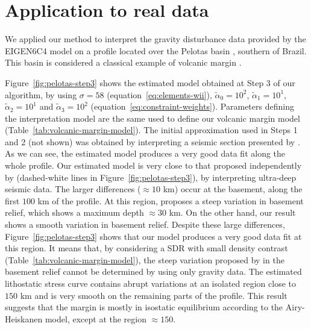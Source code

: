 \documentclass[manuscript]{geophysics}
\begin{document}
\section{Application to real data}

We applied our method to interpret the gravity disturbance data provided by the 
EIGEN6C4 model \citep{forste2014} on a profile located over the Pelotas basin
\citep{stica-etal2014}, southern of Brazil. This basin is 
considered a classical example of volcanic margin \citep{geoffroy2005}.

Figure~\ref{fig:pelotas-step3} shows the estimated model obtained at Step 3
of our algorithm, by using $\sigma = 58$ (equation~\ref{eq:elements-wii}), 
$\tilde{\alpha}_{0} = 10^{2}$, $\tilde{\alpha}_{1} = 10^{1}$, 
$\tilde{\alpha}_{2} = 10^{1}$ and $\tilde{\alpha}_{3} = 10^{2}$
(equation~\ref{eq:constraint-weights}).
Parameters defining the interpretation model are the same used
to define our volcanic margin model (Table~\ref{tab:volcanic-margin-model}).
The initial approximation used in Steps 1 and 2 (not shown) was obtained by 
interpreting a seismic section presented by \citet{stica-etal2014}.
As we can see, the estimated model produces a very good data fit along the whole
profile. Our estimated model is very close to that proposed independently by
\citet{zalan2015} (dashed-white lines in Figure~\ref{fig:pelotas-step3}), by
interpreting ultra-deep seismic data.
The larger differences ($\approx 10$ km) occur at the basement, along the first 
$100$ km of the profile.
At this region, \citeauthor{zalan2015} proposes a steep variation in basement
relief, which shows a maximum depth $\approx 30$ km. On the other hand, our result 
shows a smooth variation in basement relief. Despite these large differences,
Figure~\ref{fig:pelotas-step3} shows that our model produces a very good data fit
at this region. It means that, by considering a SDR with small density contrast 
(Table~\ref{tab:volcanic-margin-model}), the steep variation 
proposed by \citeauthor{zalan2015} in the basement relief cannot be determined by 
using only gravity data.
The estimated lithostatic stress curve contains abrupt variations
at an isolated region close to $150$ km and is very smooth on the remaining parts
of the profile. This result suggests that the margin is mostly in isostatic 
equilibrium according to the Airy-Heiskanen model, except at the region $\approx 150$.
\end{document}
